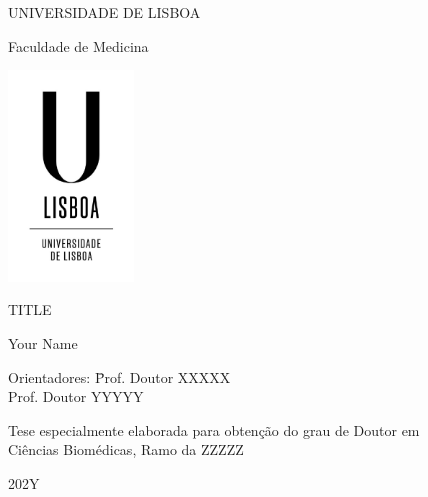 \documentclass[12pt, twoside]{report}
\begin{document}
\begin{titlepage}
    \begin{center}
        \vspace*{-.2cm}
        UNIVERSIDADE DE LISBOA
        
        Faculdade de Medicina
        
        \includegraphics[width=0.25\textwidth]{images/logo/ulisboa-only}
        
        \vspace{1.8cm}
        TITLE

        \vspace{1.1cm}        
            
        \vspace{0.9cm}            
        Your Name
    \end{center}

    \vspace{0.9cm}
    \begin{tabbing}
        Orientadores: \= Prof. Doutor XXXXX \\
                      \> Prof. Doutor YYYYY \\
    \end{tabbing}
    
    \vspace{1.8cm}
    \begin{center}        
        Tese especialmente elaborada para obtenção do grau de Doutor em\\
        Ciências Biomédicas, Ramo da ZZZZZ
            
        \vfill
        202Y
        \vspace{.7cm}
    \end{center}
\end{titlepage}
\end{document}
